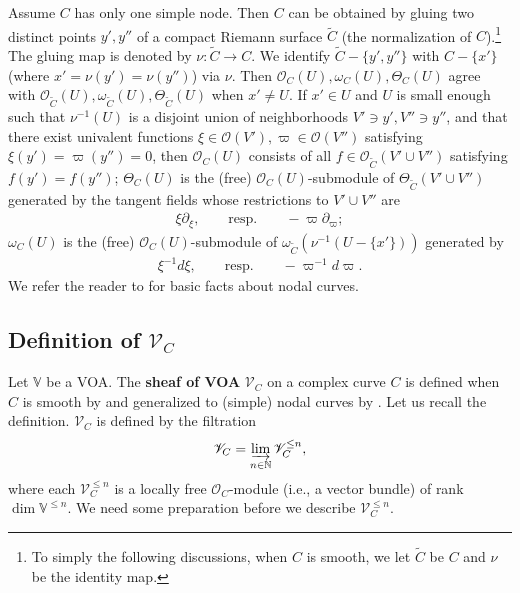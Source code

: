 \documentclass[12pt,a4paper,notitlepage]{article}
\theoremstyle{definition}
\theoremstyle{plain}
\newcommand{\wtd}{\widetilde}
\newcommand{\scr}{\mathscr}
\newcommand{\Vbb}{\mathbb V}
\newcommand{\Nbb}{\mathbb N}
\numberwithin{equation}{section}
\begin{document}
Assume $C$ has only one simple node. Then $C$ can be obtained by gluing two distinct points $y',y''$ of a compact Riemann surface $\wtd C$ (the normalization of $C$).\footnote{To simply the following discussions, when $C$ is smooth, we let $\wtd C$ be $C$ and $\nu$ be the identity map.} The gluing map is denoted by $\nu:\wtd C\rightarrow C$. We identify $\wtd C-\{y',y''\}$ with $C-\{x'\}$ (where $x'=\nu(y')=\nu(y'')$) via $\nu$. Then  $\scr O_C(U),\omega_C(U),\Theta_C(U)$ agree with $\scr O_{\wtd C}(U),\omega_{\wtd C}(U),\Theta_{\wtd C}(U)$ when $x'\neq U$. If $x'\in U$ and $U$ is small enough such that $\nu^{-1}(U)$ is a disjoint union of neighborhoods $V'\ni y',V''\ni y''$, and that there exist univalent functions $\xi\in\scr O(V'),\varpi\in\scr O(V'')$ satisfying $\xi(y')=\varpi(y'')=0$, then $\scr O_C(U)$ consists of all $f\in\scr O_{\wtd C}(V'\cup V'')$ satisfying $f(y')=f(y'')$; $\Theta_C(U)$ is the (free) $\scr O_C(U)$-submodule of $\Theta_{\wtd C}(V'\cup V'')$ generated by the tangent fields whose restrictions to $V'\cup V''$ are 
\begin{align}
\xi\partial_\xi,\qquad \text{resp.}\qquad -\varpi\partial_\varpi;\label{eq9}
\end{align}   
$\omega_C(U)$ is the (free) $\scr O_C(U)$-submodule of $\omega_{\wtd C}(\nu^{-1}(U-\{x'\}))$ generated by
\begin{align*}
\xi^{-1}d\xi,\qquad \text{resp.}\qquad -\varpi^{-1}d\varpi.
\end{align*}  
We refer the reader to \cite[Chap.X]{ACG11} for  basic facts about nodal curves.




\subsection*{Definition of $\scr V_C$}


Let $\Vbb$ be a VOA. The \textbf{sheaf of VOA} $\scr V_C$ on a complex curve $C$ is defined when $C$ is smooth by \cite{FB04} and generalized to (simple) nodal curves by \cite{DGT19a}. Let us recall the definition.\index{VC@$\scr V_C,\scr V_C^{\leq n}$} $\scr V_C$ is defined by the filtration
\begin{align*}
\scr V_C=\varinjlim_{n\in\Nbb}\scr V_C^{\leq n},
\end{align*}
where each $\scr V_C^{\leq n}$ is a  locally free $\scr O_C$-module (i.e., a vector bundle) of rank $\dim\Vbb^{\leq n}$. We need some preparation before we describe $\scr V_C^{\leq n}$.
\end{document}
